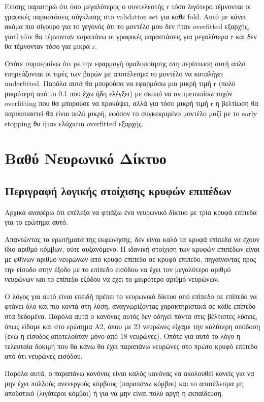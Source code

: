 \documentclass[12pt,a4paper]{article}
\begin{document}
Επίσης παρατηρώ ότι όσο μεγαλύτερος ο συντελεστής r τόσο λιγότερο τέμνονται οι γραφικές παραστάσεις σύγκλισης στο validation set για κάθε fold. Αυτό με κάνει ακόμα πιο σίγουρο για το γεγονός ότι το μοντέλο μου δεν ήταν overfitted εξαρχής, γιατί τότε θα τέμνονταν παραπάνω οι γραφικές παραστάσεις για μεγαλύτερα r και δεν θα τέμνονταν τόσο για μικρά r.

Οπότε συμπεραίνω ότι με την εφαρμογή ομαλοποίησης στη περίπτωση αυτή απλά επηρεάζονται οι τιμές των βαρών με αποτέλεσμα το μοντέλο να καταλήγει underfitted. Παρόλα αυτά θα μπορούσα να εφαρμόσω μια μικρή τιμή r (πολύ μικρότερη από το 0.1 που έχω ήδη ελέγξει) με σκοπό να αντιμετωπίσω τυχόν overfitting που θα μπορούσε να προκύψει, αλλά για τόσο μικρή τιμή r η βελτίωση θα παρουσιαστεί θα είναι πολύ μικρή, εφόσον το συγκεκριμένο μοντέλο μαζί με το early stopping θα ήταν ελάχιστα overfitted εξαρχής.

\section{Βαθύ Νευρωνικό Δίκτυο}

\subsection{Περιγραφή λογικής στοίχισης κρυφών επιπέδων}

Αρχικά αναφέρω ότι επέλεξα να φτιάξω ένα νευρωνικό δίκτυο με τρία κρυφά επίπεδα για το ερώτημα αυτό. 

Απαντώντας τα ερωτήματα της εκφώνησης, δεν είναι καλό τα κρυφά επίπεδα να έχουν ίδιο αριθμό κόμβων, ούτε αυξανόμενο. Η ιδανική στοίχιση των κρυφών επιπέδων είναι με φθίνων αριθμό νευρώνων από κρυφό επίπεδο σε κρυφό επίπεδο, πηγαίνοντας προς την είσοδο στην έξοδο με το επίπεδο εισόδου να έχει τον μεγαλύτερο αριθμό νευρώνων και το επίπεδο εξόδου να έχει το μικρότερο αριθμό νευρώνων. 

Ο λόγος για αυτό είναι επειδή πρέπει το νευρωνικό δίκτυο από επίπεδο σε επίπεδο να φτάνει όλο και πιο κοντά στη λύση, αναγνωρίζοντας χαρακτηριστικά σε κάθε επίπεδο στα δεδομένα. Παρόλα αυτά ο κανόνας αυτός δεν οδηγεί πάντα στις βέλτιστες λύσεις, όπως είδαμε και στο ερώτημα Α2, όπου με 23 νευρώνες είχαμε την καλύτερη απόδοση (ενώ η είσοδος αποτελούταν μόνο από 18 νευρώνες). Οπότε για αυτό το λόγο η τελευταία δοκιμή που θα κάνω θα έχει παραπάνω νευρώνες στο πρώτο κρυφό επίπεδο από ότι νευρώνες εισόδου.

Παρόλα αυτά, ο παραπάνω κανόνας είναι καλός κανόνας να ακολουθεί κανείς για να μην έχει πολλούς ανενεργούς κόμβους (παραπάνω κόμβοι) και το αποτέλεσμα μη αποδοτικό (λιγότεροι κόμβοι) ή για να μην είναι πολύ αργή η εκπαίδευση.
\end{document}
